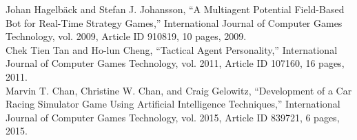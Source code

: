 \begin{thebibliography}{1}
 Johan Hagelbäck and Stefan J. Johansson, “A Multiagent Potential Field-Based Bot for Real-Time Strategy Games,” International Journal of Computer Games Technology, vol. 2009, Article ID 910819, 10 pages, 2009. 
\\

Chek Tien Tan and Ho-lun Cheng, “Tactical Agent Personality,” International Journal of Computer Games Technology, vol. 2011, Article ID 107160, 16 pages, 2011.
\\

Marvin T. Chan, Christine W. Chan, and Craig Gelowitz, “Development of a Car Racing Simulator Game Using Artificial Intelligence Techniques,” International Journal of Computer Games Technology, vol. 2015, Article ID 839721, 6 pages, 2015.

\end{thebibliography}